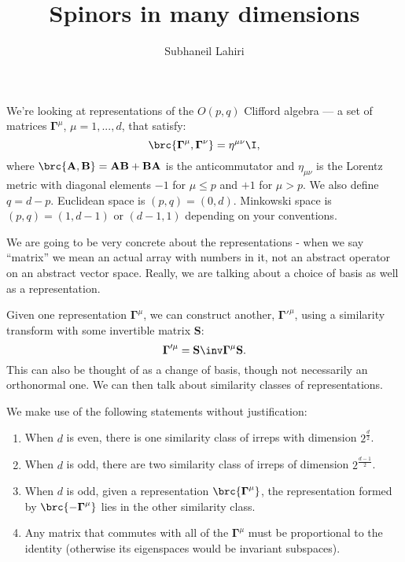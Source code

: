 \documentclass[11pt]{article}
\newcommand{\Gammab}{\boldsymbol{\Gamma}}
\renewcommand{\S}{\mathbf{S}}
\newcommand{\A}{\mathbf{A}}
\newcommand{\B}{\mathbf{B}}
\begin{document}
\title{Spinors in many dimensions}
\author{Subhaneil Lahiri}
\date{}
\maketitle
\tableofcontents
\vspace{1em}

We're looking at representations of the $O(p,q)$ Clifford algebra --- a set of matrices $\Gammab^\mu$, $\mu = 1, ..., d$, that satisfy:
%
\begin{equation}\label{eq:clifford}
  \brc{ \Gammab^\mu, \Gammab^\nu } = \eta^{\mu\nu} \I,
\end{equation}
%
where $\brc{ \A, \B } = \A\B + \B\A$ is the anticommutator and $\eta_{\mu\nu}$ is the Lorentz metric with diagonal elements $-1$ for $\mu \leq p$ and $+1$ for $\mu > p$. We also define $q = d - p$.
Euclidean space is \( (p,q) = (0,d) \).
Minkowski space is \( (p,q) = (1,d-1) \) or \( (d-1,1) \) depending on your conventions.

We are going to be very concrete about the representations - when we say ``matrix'' we mean an actual array with numbers in it, not an abstract operator on an abstract vector space.
Really, we are talking about a choice of basis as well as a representation.

Given one representation $\Gammab^\mu$, we can construct another, $\Gammab'^{\mu}$, using a similarity transform with some invertible matrix $\S$:
%
\begin{equation}\label{eq:similarity}
  \Gammab'^{\mu} = \S\inv \Gammab^\mu \S.
\end{equation}
%
This can also be thought of as a change of basis, though not necessarily an orthonormal one.
We can then talk about similarity classes of representations.

We make use of the following statements without justification:
%
\begin{enumerate}
  \item When $d$ is even, there is one similarity class of irreps with dimension $2^{\frac{d}{2}}$.
      \label{it:even}
  \item When $d$ is odd, there are two similarity class of irreps of dimension $2^{\frac{d-1}{2}}$.
      \label{it:odd}
  \item When $d$ is odd, given a representation $\brc{\Gammab^\mu}$, the representation formed by $\brc{ -\Gammab^\mu }$ lies in the other similarity class.
      \label{it:oddchi}
  \item Any matrix that commutes with all of the $\Gammab^\mu$ must be proportional to the identity (otherwise its eigenspaces would be invariant subspaces).
      \label{it:commute}
\end{enumerate}
\end{document}
